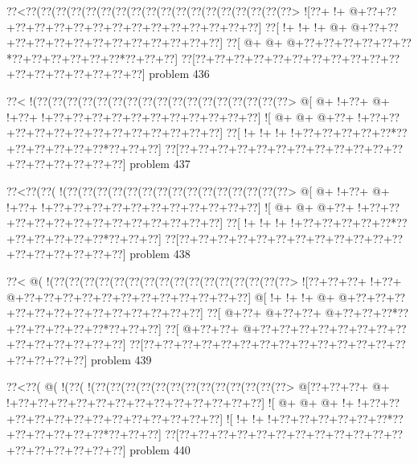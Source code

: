 \vbox{\vbox{\goo
\0??<\0??(\0??(\0??(\0??(\0??(\0??(\0??(\0??(\0??(\0??(\0??(\0??(\0??(\0??(\0??(\0??(\0??(\0??>
\- ![\0??+\- !+\- @+\0??+\0??+\0??+\0??+\0??+\0??+\0??+\0??+\0??+\0??+\0??+\0??+\0??+\0??+\0??]
\0??[\- !+\- !+\- !+\- @+\- @+\0??+\0??+\0??+\0??+\0??+\0??+\0??+\0??+\0??+\0??+\0??+\0??+\0??]
\0??[\- @+\- @+\- @+\0??+\0??+\0??+\0??+\0??+\0??*\0??+\0??+\0??+\0??+\0??+\0??*\0??+\0??+\0??]
\0??[\0??+\0??+\0??+\0??+\0??+\0??+\0??+\0??+\0??+\0??+\0??+\0??+\0??+\0??+\0??+\0??+\0??+\0??]
}
\hfil problem 436\hfil\break
}



\vbox{\vbox{\goo
\0??<\- !(\0??(\0??(\0??(\0??(\0??(\0??(\0??(\0??(\0??(\0??(\0??(\0??(\0??(\0??(\0??(\0??(\0??>
\- @[\- @+\- !+\0??+\- @+\- !+\0??+\- !+\0??+\0??+\0??+\0??+\0??+\0??+\0??+\0??+\0??+\0??+\0??]
\- ![\- @+\- @+\- @+\0??+\- !+\0??+\0??+\0??+\0??+\0??+\0??+\0??+\0??+\0??+\0??+\0??+\0??+\0??]
\0??[\- !+\- !+\- !+\- !+\0??+\0??+\0??+\0??+\0??*\0??+\0??+\0??+\0??+\0??+\0??*\0??+\0??+\0??]
\0??[\0??+\0??+\0??+\0??+\0??+\0??+\0??+\0??+\0??+\0??+\0??+\0??+\0??+\0??+\0??+\0??+\0??+\0??]
}
\hfil problem 437\hfil\break
}



\vbox{\vbox{\goo
\0??<\0??(\0??(\- !(\0??(\0??(\0??(\0??(\0??(\0??(\0??(\0??(\0??(\0??(\0??(\0??(\0??(\0??(\0??>
\- @[\- @+\- !+\0??+\- @+\- !+\0??+\- !+\0??+\0??+\0??+\0??+\0??+\0??+\0??+\0??+\0??+\0??+\0??]
\- ![\- @+\- @+\- @+\0??+\- !+\0??+\0??+\0??+\0??+\0??+\0??+\0??+\0??+\0??+\0??+\0??+\0??+\0??]
\0??[\- !+\- !+\- !+\- !+\0??+\0??+\0??+\0??+\0??*\0??+\0??+\0??+\0??+\0??+\0??*\0??+\0??+\0??]
\0??[\0??+\0??+\0??+\0??+\0??+\0??+\0??+\0??+\0??+\0??+\0??+\0??+\0??+\0??+\0??+\0??+\0??+\0??]
}
\hfil problem 438\hfil\break
}



\vbox{\vbox{\goo
\0??<\- @(\- !(\0??(\0??(\0??(\0??(\0??(\0??(\0??(\0??(\0??(\0??(\0??(\0??(\0??(\0??(\0??(\0??>
\- ![\0??+\0??+\0??+\- !+\0??+\- @+\0??+\0??+\0??+\0??+\0??+\0??+\0??+\0??+\0??+\0??+\0??+\0??]
\- @[\- !+\- !+\- !+\- @+\- @+\0??+\0??+\0??+\0??+\0??+\0??+\0??+\0??+\0??+\0??+\0??+\0??+\0??]
\0??[\- @+\0??+\- @+\0??+\0??+\- @+\0??+\0??+\0??*\0??+\0??+\0??+\0??+\0??+\0??*\0??+\0??+\0??]
\0??[\- @+\0??+\0??+\- @+\0??+\0??+\0??+\0??+\0??+\0??+\0??+\0??+\0??+\0??+\0??+\0??+\0??+\0??]
\0??[\0??+\0??+\0??+\0??+\0??+\0??+\0??+\0??+\0??+\0??+\0??+\0??+\0??+\0??+\0??+\0??+\0??+\0??]
}
\hfil problem 439\hfil\break
}



\vbox{\vbox{\goo
\0??<\0??(\- @(\- !(\0??(\- !(\0??(\0??(\0??(\0??(\0??(\0??(\0??(\0??(\0??(\0??(\0??(\0??(\0??>
\- @[\0??+\0??+\0??+\- @+\- !+\0??+\0??+\0??+\0??+\0??+\0??+\0??+\0??+\0??+\0??+\0??+\0??+\0??]
\- ![\- @+\- @+\- @+\- !+\- !+\0??+\0??+\0??+\0??+\0??+\0??+\0??+\0??+\0??+\0??+\0??+\0??+\0??]
\- ![\- !+\- !+\- !+\0??+\0??+\0??+\0??+\0??+\0??*\0??+\0??+\0??+\0??+\0??+\0??*\0??+\0??+\0??]
\0??[\0??+\0??+\0??+\0??+\0??+\0??+\0??+\0??+\0??+\0??+\0??+\0??+\0??+\0??+\0??+\0??+\0??+\0??]
}
\hfil problem 440\hfil\break
}




